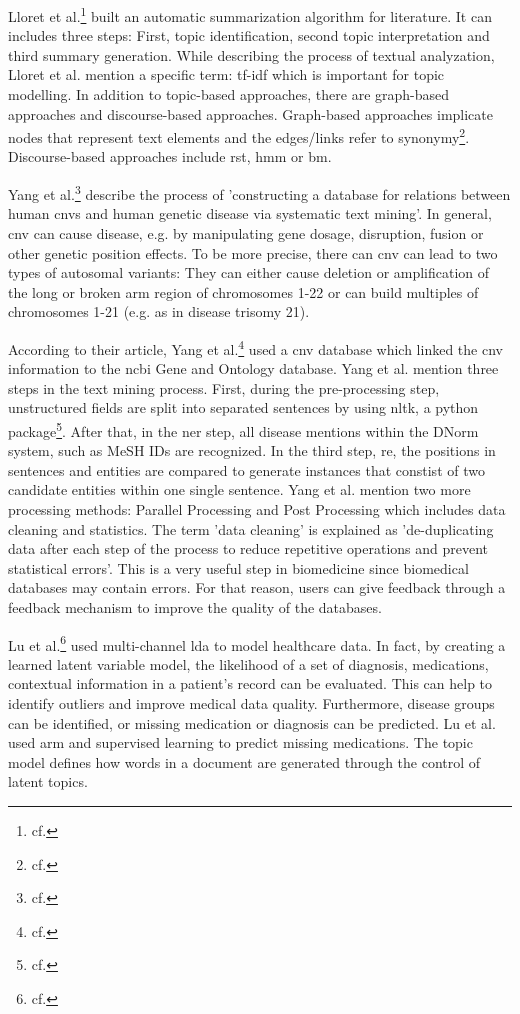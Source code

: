 Lloret et al.\footnote{cf.\autocite{lloret_2012}} built an automatic summarization algorithm for literature. It can includes three steps: First, topic identification, second topic interpretation and third summary generation. While describing the process of textual analyzation, Lloret et al. mention a specific term: \gls{tf-idf} which is important for topic modelling. In addition to topic-based approaches, there are graph-based approaches and discourse-based approaches. Graph-based approaches implicate nodes that represent text elements and the edges/links refer to synonymy\footnote{cf.\autocite{lloret_2012}}. Discourse-based approaches include \gls{rst}, \gls{hmm} or \gls{bm}. 

Yang et al.\footnote{cf.\autocite{yang_2018}} describe the process of 'constructing a database for relations between human \gls{cnv}s and human genetic disease via systematic text mining'. In general, \gls{cnv} can cause disease, e.g. by manipulating gene dosage, disruption, fusion or other genetic position effects. 
To be more precise, there can \gls{cnv} can lead to two types of autosomal variants: They can either cause deletion or amplification of the long or broken arm region of chromosomes 1-22 or can build multiples of chromosomes 1-21 (e.g. as in disease trisomy 21). 

According to their article, Yang et al.\footnote{cf.\autocite{yang_2018}} used a \gls{cnv} database which linked the \gls{cnv} information to the \gls{ncbi} Gene and Ontology database. Yang et al. mention three steps in the text mining process. First, during the pre-processing step, unstructured fields are split into separated sentences by using \gls{nltk}, a python package\footnote{cf.\autocite{nltk}}. After that, in the \gls{ner} step, all disease mentions within the DNorm system, such as MeSH IDs are recognized. In the third step, \gls{re}, the positions in sentences and entities are compared to generate instances that constist of two candidate entities within one single sentence.
Yang et al. mention two more processing methods: Parallel Processing and Post Processing which includes data cleaning and statistics. The term 'data cleaning' is explained as 'de-duplicating data after each step of the process to reduce repetitive operations and prevent statistical errors'. This is a very useful step in biomedicine since biomedical databases may contain errors. For that reason, users can give feedback through a feedback mechanism to improve the quality of the databases.

Lu et al.\footnote{cf.\autocite{lu_2016}} used multi-channel \gls{lda} to model healthcare data. In fact, by creating a learned latent variable model, the likelihood of a set of diagnosis, medications, contextual information in a patient's record can be evaluated. This can help to identify outliers and improve medical data quality. Furthermore, disease groups can be identified,  or missing medication or diagnosis can be predicted. Lu et al. used \gls{arm} and supervised learning to predict missing medications. The topic model defines how words in a document are generated through the control of latent topics.

